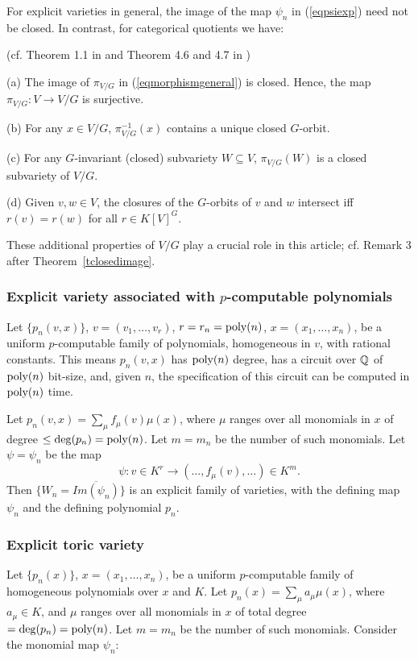 \documentclass[11pt]{article}
\begin{document}
For explicit varieties in general, the image of the map $\psi_n$ in (\ref{eqpsiexp}) need not be closed. In contrast, for
categorical quotients we have:

\begin{theorem} 
(cf. Theorem 1.1 in \cite{mumford} and Theorem 4.6 and 4.7 in \cite{popovbook}) 
\label{tmumfordnew}

\noindent (a) 
The image of $\pi_{V/G}$ in (\ref{eqmorphismgeneral}) is  closed. Hence, the map $\pi_{V/G}: V \rightarrow V/G$ is surjective.

\noindent (b) For any $x \in V /G$, $\pi_{V/G}^{-1}(x)$ contains a unique closed $G$-orbit.

\noindent (c) For any $G$-invariant (closed) subvariety $W \subseteq V$, $\pi_{V/G}(W)$ is a closed subvariety of $V/G$.

\noindent (d) Given $v,w \in V$, the closures of the $G$-orbits of $v$ and $w$ intersect iff $r(v)=r(w)$ for all $r \in K[V]^G$.
\end{theorem}

These additional properties of $V/G$ play a crucial role in this article; cf. Remark 3 after 
Theorem~\ref{tclosedimage}.

\subsubsection{Explicit variety associated with  $p$-computable polynomials} \label{scircuitexp}
Let $\{p_n(v,x)\}$, $v=(v_1,\ldots,v_r)$, $r=r_n= {\mbox {poly}}(n)$,  $x=(x_1,\ldots,x_n)$, 
be a uniform $p$-computable \cite{valiant2} family of  polynomials, homogeneous in $v$, with
rational constants.
This means $p_n(v,x)$ has ${\mbox {poly}}(n)$ degree, has a circuit over $\mathbb{Q}$ of ${\mbox {poly}}(n)$ bit-size,
and, given $n$,  the specification of this  circuit  can be computed in ${\mbox {poly}}(n)$ time.

Let $p_n(v,x)=\sum_\mu f_\mu(v) \mu(x)$, where $\mu$ ranges over all monomials
in $x$ of  degree $\le \deg(p_n)={\mbox {poly}}(n)$. Let $m=m_n$ be the number of 
such monomials. Let $\psi=\psi_n$ 
be the map
\[ \psi: v \in K^r \rightarrow (\ldots,f_\mu(v),\ldots) \in K^m.\] 
Then $\{W_n=\overline{Im(\psi_n)}\}$ is an explicit family of 
varieties, with the defining map $\psi_n$ and the defining polynomial $p_n$. 


\subsubsection{Explicit toric variety}
\label{storic}
Let $\{p_n(x)\}$, $x=(x_1,\ldots,x_n)$, be a uniform $p$-computable family of homogeneous
polynomials over $x$ and $K$. Let 
$p_n(x)=\sum_\mu a_\mu \mu(x)$, where $a_\mu \in K$, and 
$\mu$ ranges over all monomials
in $x$ of total degree $=\deg(p_n)={\mbox {poly}}(n)$. Let $m=m_n$ be the number of 
such monomials. Consider the monomial map $\psi_n$:
\end{document}
